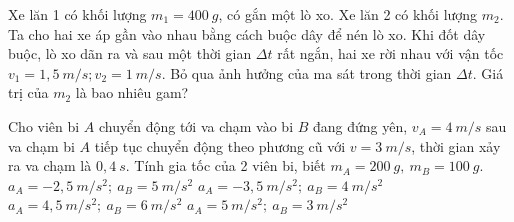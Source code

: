 \begin{vidu}
Xe lăn 1 có khối lượng $m_1=400\ g$, có gắn một lò xo. Xe lăn 2 có khối lượng $m_2$. Ta cho hai xe áp gần vào nhau bằng cách buộc dây để nén lò xo. Khi đốt dây buộc, lò xo dãn ra và sau một thời gian $\Delta t$ rất ngắn, hai xe rời nhau với vận tốc $v_1=1,5\ m / s; v_2=1\ m / s$. Bỏ qua ảnh hưởng của ma sát trong thời gian $\Delta t$. Giá trị của $m_2$ là bao nhiêu gam?\\
\shortans[oly]{ }
 \end{vidu}
\begin{vidu}
Cho viên bi $A$ chuyển động tới va chạm vào bi $B$ đang đứng yên, $v_{A}=4\ m / s$ sau va chạm bi $A$ tiếp tục chuyển động theo phương cũ với $v=3\ m / s$, thời gian xảy ra va chạm là $0,4\ s$. Tính gia tốc của 2 viên bi, biết $m_{A}=200\ g,\ m_{B}=100\ g$.
\choice
{\True $a_{A}=-2,5\ m / s^2;\  a_{B}=5\ m / s^2$}
{$a_{A}=-3,5\ m / s^2;\ a_{B}=4\ m / s^2$}
{$a_{A}=4,5\ m / s^2;\ a_{B}=6\ m / s^2$}
{$a_{A}=5\ m / s^2;\ a_{B}=3\ m / s^2$}
 \end{vidu}

